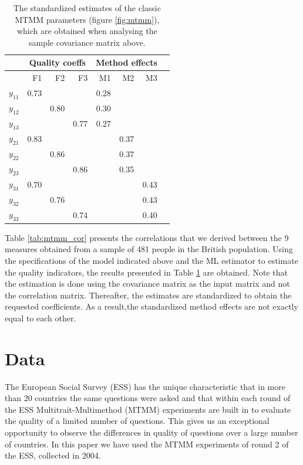 \documentclass[a4paper,12pt]{article}
\begin{document}
\begin{table}[htb]\centering\caption{The standardized estimates of the classic MTMM parameters (figure \ref{fig:mtmm}), which are obtained when analysing the sample covariance matrix above.\label{tab:mtmm_results}}
\begin{tabular}{lrrrrrrr}
\hline
&   \multicolumn{3}{c}{Quality coeffs} & \multicolumn{3}{c}{Method effects} \\
\hline
    & F1 & F2 & F3 & M1 & M2 & M3 \\ 
 $y_{11}$ &   0.73& & & 0.28\\
$y_{12}$ &  & 0.80 & & 0.30\\
$y_{13}$ &  && 0.77 & 0.27\\
$y_{21}$ &   0.83 &&&& 0.37\\
$y_{22}$ &  & 0.86 &&& 0.37\\
$y_{23}$ &  && 0.86 && 0.35\\
$y_{31}$ &   0.70 &&&&& 0.43\\
$y_{32}$ &  & 0.76 &&&& 0.43\\
$y_{33}$ &  && 0.74 &&& 0.40\\
\hline
\end{tabular}
\end{table}

Table \ref{tab:mtmm_cor} presents the correlations that we derived between the 9 measures obtained from a sample of 481 people in the British population. Using the specifications of the model indicated above and the ML estimator to estimate the quality indicators, the results presented in Table \ref{tab:mtmm_results} are obtained. Note that the estimation is done using the covariance matrix as the input matrix and not the correlation matrix. Thereafter, the estimates are standardized to obtain the requested coefficients. As a result,the standardized method effects are not exactly equal to each other.  

\clearpage

\section{Data}

The European Social Survey (ESS) has the unique characteristic that in more than 20 countries the same questions were asked and that within each round of the ESS Multitrait-Multimethod (MTMM) experiments are built in to evaluate the quality of a limited number of questions. This gives us an exceptional opportunity to observe the differences in quality of questions over a large number of countries. In this paper we have used the MTMM experiments of round 2 of the ESS, collected in 2004. 
\end{document}
